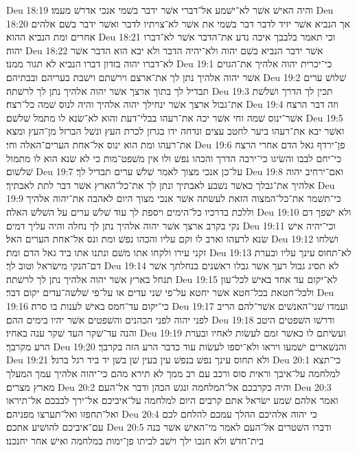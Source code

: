 Deu 18:19  והיה האישׁ אשׁר לא־ישׁמע אל־דברי אשׁר ידבר בשׁמי אנכי אדרשׁ מעמו׃
Deu 18:20  אך הנביא אשׁר יזיד לדבר דבר בשׁמי את אשׁר לא־צויתיו לדבר ואשׁר ידבר בשׁם אלהים אחרים ומת הנביא ההוא׃
Deu 18:21  וכי תאמר בלבבך איכה נדע את־הדבר אשׁר לא־דברו יהוה׃
Deu 18:22  אשׁר ידבר הנביא בשׁם יהוה ולא־יהיה הדבר ולא יבא הוא הדבר אשׁר לא־דברו יהוה בזדון דברו הנביא לא תגור ממנו׃
Deu 19:1  כי־יכרית יהוה אלהיך את־הגוים אשׁר יהוה אלהיך נתן לך את־ארצם וירשׁתם וישׁבת בעריהם ובבתיהם׃
Deu 19:2  שׁלושׁ ערים תבדיל לך בתוך ארצך אשׁר יהוה אלהיך נתן לך לרשׁתה׃
Deu 19:3  תכין לך הדרך ושׁלשׁת את־גבול ארצך אשׁר ינחילך יהוה אלהיך והיה לנוס שׁמה כל־רצח׃
Deu 19:4  וזה דבר הרצח אשׁר־ינוס שׁמה וחי אשׁר יכה את־רעהו בבלי־דעת והוא לא־שׂנא לו מתמל שׁלשׁם׃
Deu 19:5  ואשׁר יבא את־רעהו ביער לחטב עצים ונדחה ידו בגרזן לכרת העץ ונשׁל הברזל מן־העץ ומצא את־רעהו ומת הוא ינוס אל־אחת הערים־האלה וחי׃
Deu 19:6  פן־ירדף גאל הדם אחרי הרצח כי־יחם לבבו והשׂיגו כי־ירבה הדרך והכהו נפשׁ ולו אין משׁפט־מות כי לא שׂנא הוא לו מתמול שׁלשׁום׃
Deu 19:7  על־כן אנכי מצוך לאמר שׁלשׁ ערים תבדיל לך׃
Deu 19:8  ואם־ירחיב יהוה אלהיך את־גבלך כאשׁר נשׁבע לאבתיך ונתן לך את־כל־הארץ אשׁר דבר לתת לאבתיך׃
Deu 19:9  כי־תשׁמר את־כל־המצוה הזאת לעשׂתה אשׁר אנכי מצוך היום לאהבה את־יהוה אלהיך וללכת בדרכיו כל־הימים ויספת לך עוד שׁלשׁ ערים על השׁלשׁ האלה׃
Deu 19:10  ולא ישׁפך דם נקי בקרב ארצך אשׁר יהוה אלהיך נתן לך נחלה והיה עליך דמים׃
Deu 19:11  וכי־יהיה אישׁ שׂנא לרעהו וארב לו וקם עליו והכהו נפשׁ ומת ונס אל־אחת הערים האל׃
Deu 19:12  ושׁלחו זקני עירו ולקחו אתו משׁם ונתנו אתו ביד גאל הדם ומת׃
Deu 19:13  לא־תחוס עינך עליו ובערת דם־הנקי מישׂראל וטוב לך׃
Deu 19:14  לא תסיג גבול רעך אשׁר גבלו ראשׁנים בנחלתך אשׁר תנחל בארץ אשׁר יהוה אלהיך נתן לך לרשׁתה׃
Deu 19:15  לא־יקום עד אחד באישׁ לכל־עון ולכל־חטאת בכל־חטא אשׁר יחטא על־פי שׁני עדים או על־פי שׁלשׁה־עדים יקום דבר׃
Deu 19:16  כי־יקום עד־חמס באישׁ לענות בו סרה׃
Deu 19:17  ועמדו שׁני־האנשׁים אשׁר־להם הריב לפני יהוה לפני הכהנים והשׁפטים אשׁר יהיו בימים ההם׃
Deu 19:18  ודרשׁו השׁפטים היטב והנה עד־שׁקר העד שׁקר ענה באחיו׃
Deu 19:19  ועשׂיתם לו כאשׁר זמם לעשׂות לאחיו ובערת הרע מקרבך׃
Deu 19:20  והנשׁארים ישׁמעו ויראו ולא־יספו לעשׂות עוד כדבר הרע הזה בקרבך׃
Deu 19:21  ולא תחוס עינך נפשׁ בנפשׁ עין בעין שׁן בשׁן יד ביד רגל ברגל׃
Deu 20:1  כי־תצא למלחמה על־איבך וראית סוס ורכב עם רב ממך לא תירא מהם כי־יהוה אלהיך עמך המעלך מארץ מצרים׃
Deu 20:2  והיה כקרבכם אל־המלחמה ונגשׁ הכהן ודבר אל־העם׃
Deu 20:3  ואמר אלהם שׁמע ישׂראל אתם קרבים היום למלחמה על־איביכם אל־ירך לבבכם אל־תיראו ואל־תחפזו ואל־תערצו מפניהם׃
Deu 20:4  כי יהוה אלהיכם ההלך עמכם להלחם לכם עם־איביכם להושׁיע אתכם׃
Deu 20:5  ודברו השׁטרים אל־העם לאמר מי־האישׁ אשׁר בנה בית־חדשׁ ולא חנכו ילך וישׁב לביתו פן־ימות במלחמה ואישׁ אחר יחנכנו׃
